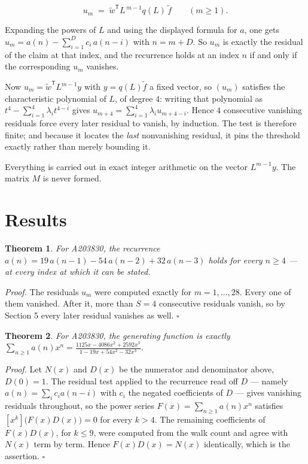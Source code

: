 \documentclass[11pt]{article}
\newtheorem{theorem}{Theorem}
\theoremstyle{definition}
\begin{document}
\[u_m \;=\; \tilde w^{\mathsf T} L^{\,m-1} q(L)\,\tilde f \qquad (m \ge 1).\]

Expanding the powers of $L$ and using the displayed formula for $a$, one gets $u_m = a(n) - \sum_{i=1}^{D} c_i\,a(n-i)$ with $n = m + D$. So $u_m$ is exactly the residual of the claim at that index, and the recurrence holds at an index $n$ if and only if the corresponding $u_m$ vanishes.

Now $u_m = \tilde w^{\mathsf T} L^{m-1} y$ with $y = q(L)\tilde f$ a fixed vector, so $(u_m)$ satisfies the characteristic polynomial of $L$, of degree $4$: writing that polynomial as $t^{4} - \sum_{i=1}^{4} \lambda_i t^{4-i}$ gives $u_{m+4} = \sum_{i=1}^{4} \lambda_i u_{m+4-i}$. Hence $4$ consecutive vanishing residuals force every later residual to vanish, by induction. The test is therefore finite; and because it locates the {\itshape last} nonvanishing residual, it pins the threshold exactly rather than merely bounding it.

Everything is carried out in exact integer arithmetic on the vector $L^{m-1}y$. The matrix $M$ is never formed.

\section{Results}

\begin{theorem} For A203830, the recurrence $a(n) = 19\,a(n-1) - 54\,a(n-2) + 32\,a(n-3)$ holds for every $n \ge 4$ --- at every index at which it can be stated.\end{theorem}

{\itshape Proof.} The residuals $u_m$ were computed exactly for $m = 1,\dots,28$. Every one of them vanished. After it, more than $S = 4$ consecutive residuals vanish, so by Section 5 every later residual vanishes as well. $\square$

\begin{theorem} For A203830, the generating function is exactly $\sum_{n\ge 1} a(n)x^n = \frac{1125x - 4086x^{2} + 2592x^{3}}{1 - 19x + 54x^{2} - 32x^{3}}$.\end{theorem}

{\itshape Proof.} Let $N(x)$ and $D(x)$ be the numerator and denominator above, $D(0)=1$. The residual test applied to the recurrence read off $D$ --- namely $a(n) = \sum_i c_i a(n-i)$ with $c_i$ the negated coefficients of $D$ --- gives vanishing residuals throughout, so the power series $F(x)=\sum_{n\ge 1}a(n)x^n$ satisfies $[x^k]\bigl(F(x)D(x)\bigr) = 0$ for every $k > 4$. The remaining coefficients of $F(x)D(x)$, for $k \le 9$, were computed from the walk count and agree with $N(x)$ term by term. Hence $F(x)D(x) = N(x)$ identically, which is the assertion. $\square$
\end{document}
